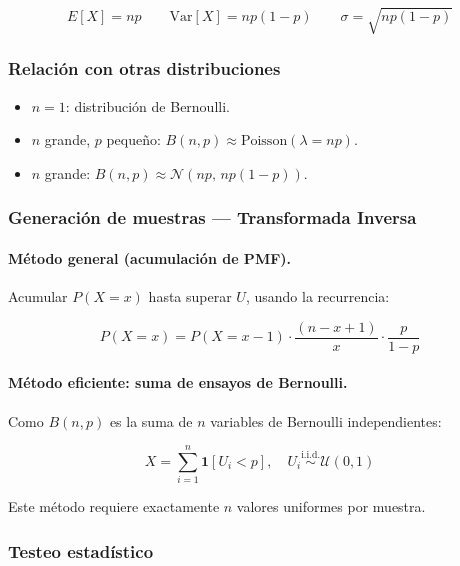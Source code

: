 \begin{equation}
E[X] = np \qquad \text{Var}[X] = np(1-p) \qquad \sigma = \sqrt{np(1-p)}
\end{equation}

\subsubsection{Relación con otras distribuciones}

\begin{itemize}
    \item $n = 1$: distribución de Bernoulli.
    \item $n$ grande, $p$ pequeño: $B(n,p) \approx \text{Poisson}(\lambda = np)$.
    \item $n$ grande: $B(n,p) \approx \mathcal{N}(np,\, np(1-p))$.
\end{itemize}

\subsubsection{Generación de muestras — Transformada Inversa}

\paragraph{Método general (acumulación de PMF).}
Acumular $P(X = x)$ hasta superar $U$, usando la recurrencia:

\begin{equation}
P(X = x) = P(X = x-1) \cdot \frac{(n - x + 1)}{x} \cdot \frac{p}{1-p}
\end{equation}

\paragraph{Método eficiente: suma de ensayos de Bernoulli.}
Como $B(n,p)$ es la suma de $n$ variables de Bernoulli independientes:

\begin{equation}
\boxed{X = \sum_{i=1}^{n} \mathbf{1}[U_i < p],
\quad U_i \overset{\text{i.i.d.}}{\sim} \mathcal{U}(0,1)}
\end{equation}

Este método requiere exactamente $n$ valores uniformes por muestra.

\subsubsection{Testeo estadístico}


